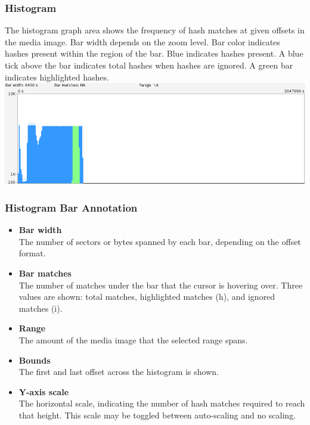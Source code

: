 \documentclass[11pt,fleqn]{article} %
\begin{document}
\subsubsection{Histogram}
The histogram graph area shows the frequency of hash matches at given offsets in the media image. Bar width depends on the zoom level. Bar color indicates hashes present within the region of the bar. Blue indicates hashes present. A blue tick above the bar indicates total hashes when hashes are ignored. A green bar indicates highlighted hashes.\\
\includegraphics[scale=.4]{screenshots/histogram}\\

\subsubsection{Histogram Bar Annotation}
\begin{itemize}
\item \textbf{Bar width}\\
The number of sectors or bytes spanned by each bar, depending on the offset format.
\item \textbf{Bar matches}\\
The number of matches under the bar that the cursor is hovering over.  Three values are shown: total matches, highlighted matches (h), and ignored matches (i).
\item \textbf{Range}\\
The amount of the media image that the selected range spans.
\item \textbf{Bounds}\\
The first and last offset across the histogram is shown.
\item \textbf{Y-axis scale}\\
The horizontal scale, indicating the number of hash matches required to reach that height. This scale may be toggled between auto-scaling and no scaling.
\end{itemize}
\end{document}
